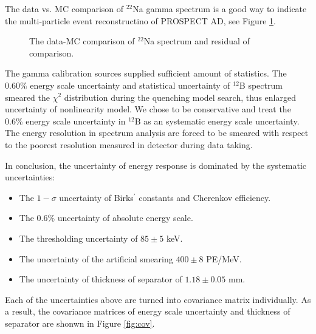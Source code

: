 The data vs. MC comparison of $^{22}$Na gamma spectrum is a good way to indicate the multi-particle event reconstructino of PROSPECT AD, see Figure \ref{fig:Na22final}.

\begin{figure}[h!]
\centering
{} \quad
{} \quad
\caption{The data-MC comparison of $^{22}$Na spectrum and residual of comparison.}
\label{fig:Na22final}
\end{figure}

\newpage
The gamma calibration sources supplied sufficient amount of statistics. 
The $0.60\%$ energy scale uncertainty and statistical uncertainty of $^{12}$B spectrum smeared the $\chi^2$ distribution during the quenching model search, thus enlarged uncertainty of nonlinearity model. 
We chose to be conservative and treat the 0.6\% energy scale uncertainty in $^{12}$B as an systematic energy scale uncertainty.
The energy resolution in spectrum analysis are forced to be smeared with respect to the poorest resolution measured in detector during data taking.

In conclusion, the uncertainty of energy response is dominated by the systematic uncertainties:

\begin{itemize}
    \item The $1-\sigma$ uncertainty of Birks$^\prime$ constants and Cherenkov efficiency.
    \item The 0.6\% uncertainty of absolute energy scale.
    \item The thresholding uncertainty of $85\pm5$ keV.
    \item The uncertainty of the artificial smearing $400\pm8$ PE/MeV.
    \item The uncertainty of thickness of separator of $1.18\pm0.05$ mm.
\end{itemize}
Each of the uncertainties above are turned into covariance matrix individually. 
As a result, the covariance matrices of energy scale uncertainty and thickness of separator are shonwn in Figure \ref{fig:cov}.

